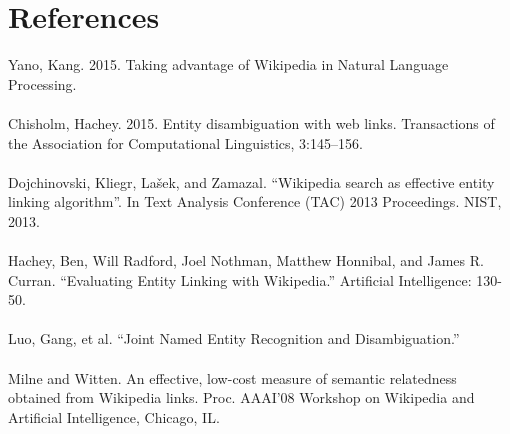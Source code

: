 \documentclass[twoside,11pt]{article}
\begin{document}
\section{References}
Yano, Kang. 2015. Taking advantage of Wikipedia in Natural Language Processing.
\\ \\
Chisholm, Hachey. 2015. Entity disambiguation with web links. Transactions of the Association for Computational Linguistics, 3:145–156.
\\ \\
Dojchinovski, Kliegr, Lašek, and Zamazal. ``Wikipedia search as effective entity linking algorithm''. In Text Analysis Conference (TAC) 2013 Proceedings. NIST, 2013.
\\ \\
Hachey, Ben, Will Radford, Joel Nothman, Matthew Honnibal, and James R. Curran. ``Evaluating Entity Linking with Wikipedia.'' Artificial Intelligence: 130-50.
\\ \\
Luo, Gang, et al. ``Joint Named Entity Recognition and Disambiguation.''
\\ \\
Milne and Witten. An effective, low-cost measure of semantic relatedness obtained from Wikipedia links. Proc. AAAI’08 Workshop on Wikipedia and Artificial Intelligence, Chicago, IL.
\end{document}
